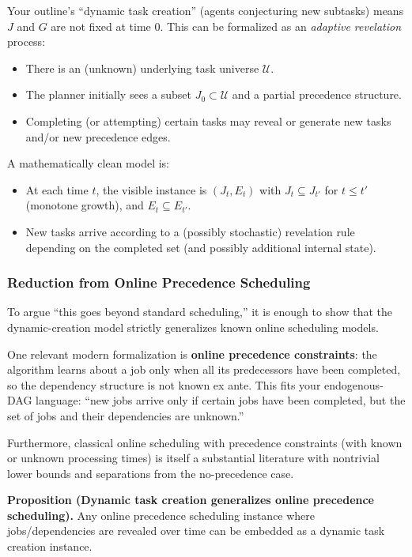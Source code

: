 Your outline's ``dynamic task creation'' (agents conjecturing new subtasks) means \(J\) and \(G\) are not fixed at time \(0\). This can be formalized as an \emph{adaptive revelation} process:

\begin{itemize}
\item There is an (unknown) underlying task universe \(\mathcal{U}\).
\item The planner initially sees a subset \(J_0\subset \mathcal{U}\) and a partial precedence structure.
\item Completing (or attempting) certain tasks may reveal or generate new tasks and/or new precedence edges.
\end{itemize}

A mathematically clean model is:

\begin{itemize}
\item At each time \(t\), the visible instance is \((J_t, E_t)\) with \(J_t\subseteq J_{t'}\) for \(t\le t'\) (monotone growth), and \(E_t\subseteq E_{t'}\).
\item New tasks arrive according to a (possibly stochastic) revelation rule depending on the completed set (and possibly additional internal state).
\end{itemize}

\subsubsection{Reduction from Online Precedence Scheduling}

To argue ``this goes beyond standard scheduling,'' it is enough to show that the dynamic-creation model strictly generalizes known online scheduling models.

One relevant modern formalization is \textbf{online precedence constraints}: the algorithm learns about a job only when all its predecessors have been completed, so the dependency structure is not known ex ante. This fits your endogenous-DAG language: ``new jobs arrive only if certain jobs have been completed, but the set of jobs and their dependencies are unknown.''

Furthermore, classical online scheduling with precedence constraints (with known or unknown processing times) is itself a substantial literature with nontrivial lower bounds and separations from the no-precedence case.

\textbf{Proposition (Dynamic task creation generalizes online precedence scheduling).} Any online precedence scheduling instance where jobs/dependencies are revealed over time can be embedded as a dynamic task creation instance.

